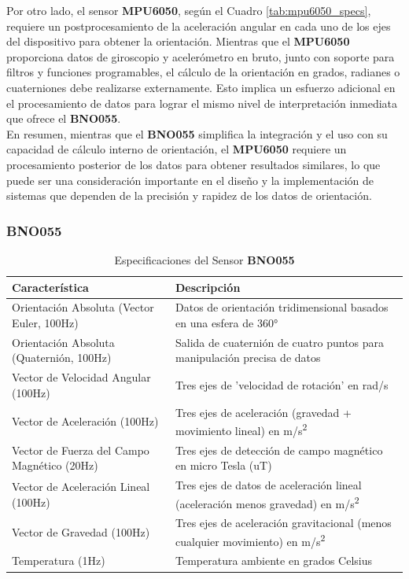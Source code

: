         Por otro lado, el sensor \textbf{MPU6050}, según el Cuadro \ref{tab:mpu6050_specs}, requiere un postprocesamiento de la aceleración angular en cada uno de los ejes del dispositivo para obtener la orientación. Mientras que el \textbf{MPU6050} proporciona datos de giroscopio y acelerómetro en bruto, junto con soporte para filtros y funciones programables, el cálculo de la orientación en grados, radianes o cuaterniones debe realizarse externamente. Esto implica un esfuerzo adicional en el procesamiento de datos para lograr el mismo nivel de interpretación inmediata que ofrece el \textbf{BNO055}. \\ 
        
        En resumen, mientras que el \textbf{BNO055} simplifica la integración y el uso con su capacidad de cálculo interno de orientación, el \textbf{MPU6050} requiere un procesamiento posterior de los datos para obtener resultados similares, lo que puede ser una consideración importante en el diseño y la implementación de sistemas que dependen de la precisión y rapidez de los datos de orientación.


        
    \subsubsection{BNO055}

        \begin{table}[h]
            \centering
            \caption{Especificaciones del Sensor \textbf{BNO055}}
            \label{tab:bno055_specs}
            \begin{tabular}{|l|l|}
                \hline
                \textbf{Característica} & \textbf{Descripción} \\ \hline
                Orientación Absoluta (Vector Euler, 100Hz) & Datos de orientación tridimensional basados en una esfera de 360° \\ \hline
                Orientación Absoluta (Quaternión, 100Hz) & Salida de cuaternión de cuatro puntos para manipulación precisa de datos \\ \hline
                Vector de Velocidad Angular (100Hz) & Tres ejes de 'velocidad de rotación' en rad/s \\ \hline
                Vector de Aceleración (100Hz) & Tres ejes de aceleración (gravedad + movimiento lineal) en m/s\textsuperscript{2} \\ \hline
                Vector de Fuerza del Campo Magnético (20Hz) & Tres ejes de detección de campo magnético en micro Tesla (uT) \\ \hline
                Vector de Aceleración Lineal (100Hz) & Tres ejes de datos de aceleración lineal (aceleración menos gravedad) en m/s\textsuperscript{2} \\ \hline
                Vector de Gravedad (100Hz) & Tres ejes de aceleración gravitacional (menos cualquier movimiento) en m/s\textsuperscript{2} \\ \hline
                Temperatura (1Hz) & Temperatura ambiente en grados Celsius \\ \hline
            \end{tabular}
        \end{table}

